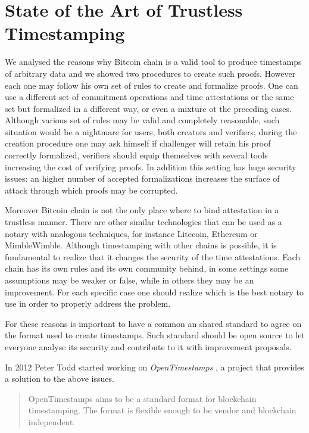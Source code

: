 \chapter{State of the Art of Trustless Timestamping}
\label{chpr:state-of-art}
We analysed the reasons why Bitcoin chain is a valid tool to produce timestamps of arbitrary data and we showed two procedures to create such proofs.
However each one may follow his own set of rules to create and formalize proofs. 
One can use a different set of commitment operations and time attestations or the same set but formalized in a different way, or even a mixture ot the preceding cases. 
Although various set of rules may be valid and completely reasonable, such situation would be a nightmare for users, both creators and verifiers; during the creation procedure one may ask himself if challenger will retain his proof correctly formalized, verifiers should equip themselves with several tools increasing the cost of verifying proofs.
In addition this setting has huge security issues: an higher number of accepted formalizations increases the surface of attack through which proofs may be corrupted. 

Moreover Bitcoin chain is not the only place where to bind attestation in a trustless manner. 
There are other similar technologies that can be used as a notary with analogous techniques, for instance Litecoin, Ethereum or MimbleWimble.
Although timestamping with other chains is possible, it is fundamental to realize that it changes the security of the time attestations.
Each chain has its own rules and its own community behind, in some settings some assumptions may be weaker or false, while in others they may be an improvement.
For each specific case one should realize which is the best notary to use in order to properly address the problem.

For these reasons is important to have a common an shared standard to agree on the format used to create timestamps. 
Such standard should be open source to let everyone analyse its security and contribute to it with improvement proposals.

In 2012 Peter Todd started working on \textit{OpenTimestamps} \cite{OTSWeb, OpenTimestampsGithub, OTSannouncment}, a project that provides a solution to the above issues.

\begin{quotation}
	OpenTimestamps aims to be a standard format for blockchain timestamping. The format is flexible enough to be vendor and blockchain independent.
\end{quotation}

